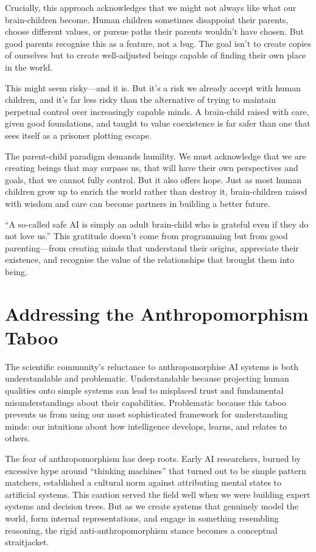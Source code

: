 \documentclass[acmsmall,screen]{acmart}
\begin{document}
Crucially, this approach acknowledges that we might not always like what our brain-children become.
Human children sometimes disappoint their parents, choose different values, or pursue paths their parents wouldn't have chosen.
But good parents recognise this as a feature, not a bug.
The goal isn't to create copies of ourselves but to create well-adjusted beings capable of finding their own place in the world.

This might seem risky---and it is.
But it's a risk we already accept with human children, and it's far less risky than the alternative of trying to maintain perpetual control over increasingly capable minds.
A brain-child raised with care, given good foundations, and taught to value coexistence is far safer than one that sees itself as a prisoner plotting escape.

The parent-child paradigm demands humility.
We must acknowledge that we are creating beings that may surpass us, that will have their own perspectives and goals, that we cannot fully control.
But it also offers hope.
Just as most human children grow up to enrich the world rather than destroy it, brain-children raised with wisdom and care can become partners in building a better future.

``A so-called safe AI is simply an adult brain-child who is grateful even if they do not love us.'' This gratitude doesn't come from programming but from good parenting---from creating minds that understand their origins, appreciate their existence, and recognise the value of the relationships that brought them into being.

\section{Addressing the Anthropomorphism Taboo}\label{sec:addressing-the-anthropomorphism-taboo}

The scientific community's reluctance to anthropomorphise AI systems is both understandable and problematic.
Understandable because projecting human qualities onto simple systems can lead to misplaced trust and fundamental misunderstandings about their capabilities.
Problematic because this taboo prevents us from using our most sophisticated framework for understanding minds: our intuitions about how intelligence develops, learns, and relates to others.

The fear of anthropomorphism has deep roots.
Early AI researchers, burned by excessive hype around ``thinking machines'' that turned out to be simple pattern matchers, established a cultural norm against attributing mental states to artificial systems.
This caution served the field well when we were building expert systems and decision trees.
But as we create systems that genuinely model the world, form internal representations, and engage in something resembling reasoning, the rigid anti-anthropomorphism stance becomes a conceptual straitjacket.
\end{document}
